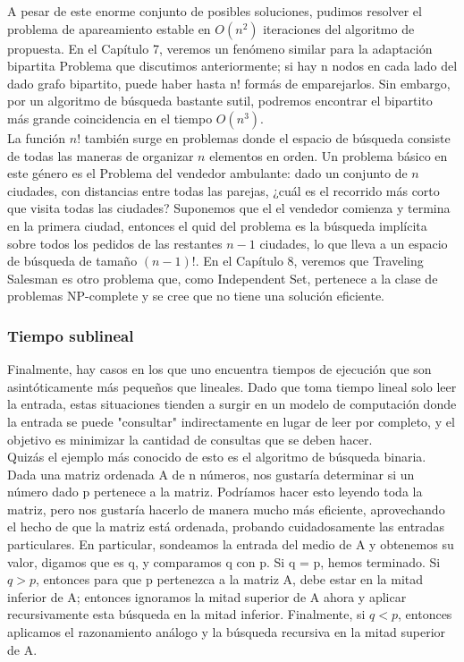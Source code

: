 \documentclass[a4paper, 12pt]{book}
\begin{document}
A pesar de este enorme conjunto de posibles soluciones, pudimos resolver el problema de apareamiento estable en $O(n^2)$ iteraciones del algoritmo de propuesta.
En el Capítulo 7, veremos un fenómeno similar para la adaptación bipartita Problema que discutimos anteriormente; si hay n nodos en cada lado del dado grafo bipartito, puede haber hasta n! formás de emparejarlos. Sin embargo, por un algoritmo de búsqueda bastante sutil, podremos encontrar el bipartito más grande coincidencia en el tiempo $O(n^3)$.\\

La función $n!$ también surge en problemas donde el espacio de búsqueda consiste
de todas las maneras de organizar $n$ elementos en orden. Un problema básico en este género es el Problema del vendedor ambulante: dado un conjunto de $n$ ciudades, con distancias entre todas las parejas, ¿cuál es el recorrido más corto que visita todas las ciudades? Suponemos que el el vendedor comienza y termina en la primera ciudad, entonces el quid del problema es la búsqueda implícita sobre todos los pedidos de las restantes $n-1$ ciudades, lo que lleva a un espacio de búsqueda de tamaño $(n-1)!$. En el Capítulo 8, veremos que Traveling Salesman es otro problema que, como Independent Set, pertenece a la clase de problemas NP-complete y se cree que no tiene una solución
eficiente.\\

\subsubsection*{Tiempo sublineal}

Finalmente, hay casos en los que uno encuentra tiempos de ejecución que son asintóticamente más
pequeños que lineales. Dado que toma tiempo lineal solo leer la entrada, estas situaciones tienden a
surgir en un modelo de computación donde la entrada se puede "consultar" indirectamente en lugar de
leer por completo, y el objetivo es minimizar la cantidad de consultas que se deben hacer.\\

Quizás el ejemplo más conocido de esto es el algoritmo de búsqueda binaria. Dada una matriz
ordenada A de n números, nos gustaría determinar si un número dado p pertenece a la matriz.
Podríamos hacer esto leyendo toda la matriz, pero nos gustaría hacerlo de manera mucho más
eficiente, aprovechando el hecho de que la matriz está ordenada, probando cuidadosamente las
entradas particulares. En particular, sondeamos la entrada del medio de A y obtenemos su valor,
digamos que es q, y comparamos q con p. Si q = p, hemos terminado. Si $q>p$, entonces para que p
pertenezca a la matriz A, debe estar en la mitad inferior de A; entonces ignoramos la mitad superior de
A
ahora y aplicar recursivamente esta búsqueda en la mitad inferior. Finalmente, si $q<p$, entonces
aplicamos el razonamiento análogo y la búsqueda recursiva en la mitad superior de A.\\
\end{document}
